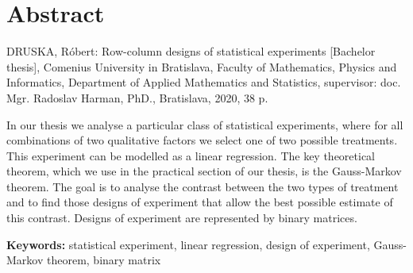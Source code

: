 \thispagestyle{empty}
\section*{Abstract}
DRUSKA, Róbert: Row-column designs of statistical experiments [Bachelor thesis],
Comenius University in Bratislava,
Faculty of Mathematics, Physics and Informatics,
Department of Applied Mathematics and Statistics,
supervisor: doc. Mgr. Radoslav Harman, PhD.,
Bratislava, 2020, 38 p.

In our thesis we analyse a particular class of statistical experiments, where for all combinations of two qualitative factors we select one of two possible treatments. 
This experiment can be modelled as a linear regression. The key theoretical theorem, which we use in the practical section of our thesis, is the Gauss-Markov theorem. 
The goal is to analyse the contrast between the two types of treatment and to find those designs of experiment that allow the best possible estimate of this contrast. 
Designs of experiment are represented by binary matrices.

\begin{flushleft}
  \textbf{Keywords:} statistical experiment, linear regression, design of experiment, Gauss-Markov theorem, binary matrix
\end{flushleft}